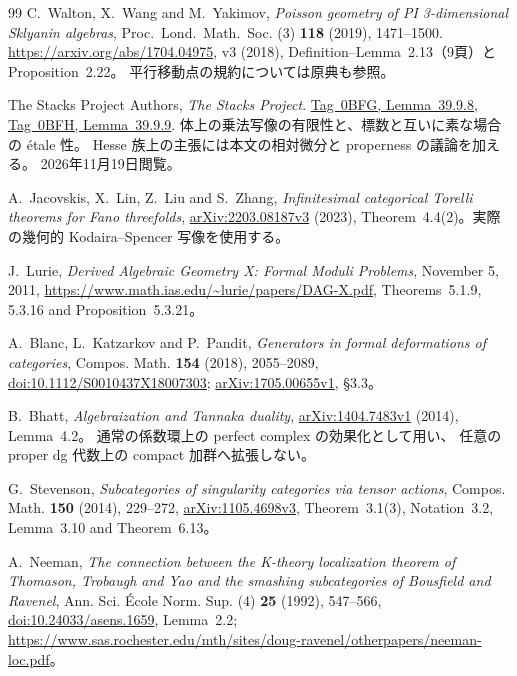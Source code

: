 \documentclass[11pt,a4paper]{ltjsarticle}
\numberwithin{equation}{section}
\begin{document}
\begin{thebibliography}{99}
C.~Walton, X.~Wang and M.~Yakimov,
\emph{Poisson geometry of PI 3-dimensional Sklyanin algebras},
Proc.~Lond.~Math.~Soc. (3) \textbf{118} (2019), 1471--1500.
\url{https://arxiv.org/abs/1704.04975}, v3 (2018),
Definition--Lemma~2.13（9頁）と Proposition~2.22。
平行移動点の規約については原典\cite{ATV}も参照。

The Stacks Project Authors, \emph{The Stacks Project}.
\href{https://stacks.math.columbia.edu/tag/0BFG}{Tag~0BFG, Lemma~39.9.8},
\href{https://stacks.math.columbia.edu/tag/0BFH}{Tag~0BFH, Lemma~39.9.9}.
体上の乗法写像の有限性と、標数と互いに素な場合の \'etale 性。
Hesse 族上の主張には本文の相対微分と properness の議論を加える。
2026年11月19日閲覧。

A.~Jacovskis, X.~Lin, Z.~Liu and S.~Zhang,
\emph{Infinitesimal categorical Torelli theorems for Fano threefolds},
\href{https://arxiv.org/abs/2203.08187v3}{arXiv:2203.08187v3} (2023),
Theorem~4.4(2)。実際の幾何的 Kodaira--Spencer 写像を使用する。

J.~Lurie, \emph{Derived Algebraic Geometry X: Formal Moduli Problems},
November 5, 2011,
\url{https://www.math.ias.edu/~lurie/papers/DAG-X.pdf},
Theorems~5.1.9, 5.3.16 and Proposition~5.3.21。

A.~Blanc, L.~Katzarkov and P.~Pandit,
\emph{Generators in formal deformations of categories},
Compos. Math. \textbf{154} (2018), 2055--2089,
\href{https://doi.org/10.1112/S0010437X18007303}{doi:10.1112/S0010437X18007303};
\href{https://arxiv.org/abs/1705.00655v1}{arXiv:1705.00655v1}, \S3.3。

B.~Bhatt, \emph{Algebraization and Tannaka duality},
\href{https://arxiv.org/abs/1404.7483v1}{arXiv:1404.7483v1} (2014),
Lemma~4.2。
通常の係数環上の perfect complex の効果化として用い、
任意の proper dg 代数上の compact 加群へ拡張しない。

G.~Stevenson, \emph{Subcategories of singularity categories via tensor actions},
Compos. Math. \textbf{150} (2014), 229--272,
\href{https://arxiv.org/abs/1105.4698v3}{arXiv:1105.4698v3},
Theorem~3.1(3), Notation~3.2, Lemma~3.10 and Theorem~6.13。

A.~Neeman, \emph{The connection between the K-theory localization theorem of Thomason,
Trobaugh and Yao and the smashing subcategories of Bousfield and Ravenel},
Ann. Sci. \'Ecole Norm. Sup. (4) \textbf{25} (1992), 547--566,
\href{https://doi.org/10.24033/asens.1659}{doi:10.24033/asens.1659}, Lemma~2.2;
\url{https://www.sas.rochester.edu/mth/sites/doug-ravenel/otherpapers/neeman-loc.pdf}。


\end{thebibliography}
\end{document}
